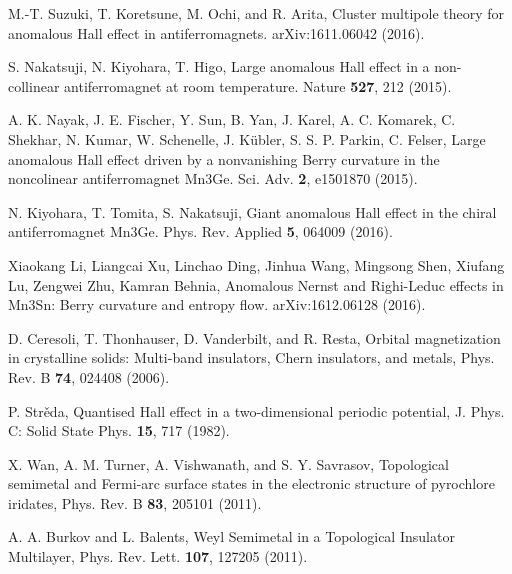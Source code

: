 \documentclass[letter,twocolumn,amsmath,amssymb,superscriptaddress]{jpsj3}
\begin{document}
\begin{thebibliography}{99}
M.-T. Suzuki, T. Koretsune, M. Ochi, and R. Arita,
Cluster multipole theory for anomalous Hall effect in antiferromagnets.
arXiv:1611.06042 (2016).



S. Nakatsuji, N. Kiyohara, T. Higo, Large anomalous Hall effect in a non-collinear antiferromagnet at room temperature. Nature {\bf 527}, 212 (2015).

A. K. Nayak, J. E. Fischer, Y. Sun, B. Yan, J. Karel, A. C. Komarek, C. Shekhar, N. Kumar, W. Schenelle, J. K{\"u}bler, S. S. P. Parkin, C. Felser, Large anomalous Hall effect driven by a nonvanishing Berry curvature in the noncolinear antiferromagnet Mn3Ge. Sci. Adv. {\bf 2}, e1501870 (2015).

N. Kiyohara, T. Tomita, S. Nakatsuji, Giant anomalous Hall effect in the chiral antiferromagnet Mn3Ge. Phys. Rev. Applied {\bf 5}, 064009 (2016).

Xiaokang Li, Liangcai Xu, Linchao Ding, Jinhua Wang, Mingsong Shen, Xiufang Lu, Zengwei Zhu, Kamran Behnia, 
Anomalous Nernst and Righi-Leduc effects in Mn3Sn: Berry curvature and entropy flow.
arXiv:1612.06128 (2016).




D. Ceresoli, T. Thonhauser, D. Vanderbilt, and R. Resta,
Orbital magnetization in crystalline solids: Multi-band insulators, Chern insulators, and metals,
Phys. Rev. B {\bf 74}, 024408 (2006).

P. Str\v{e}da, 
Quantised Hall effect in a two-dimensional periodic potential,
J. Phys. C: Solid State Phys. {\bf 15}, 717 (1982).

X. Wan, A. M. Turner, A. Vishwanath, and S. Y. Savrasov, Topological semimetal and Fermi-arc surface states in the electronic structure of pyrochlore iridates, Phys. Rev. B {\bf 83}, 205101 (2011).

A. A. Burkov and L. Balents, Weyl Semimetal in a Topological Insulator Multilayer, Phys. Rev. Lett. {\bf 107}, 127205 (2011).


\end{thebibliography}
\end{document}
